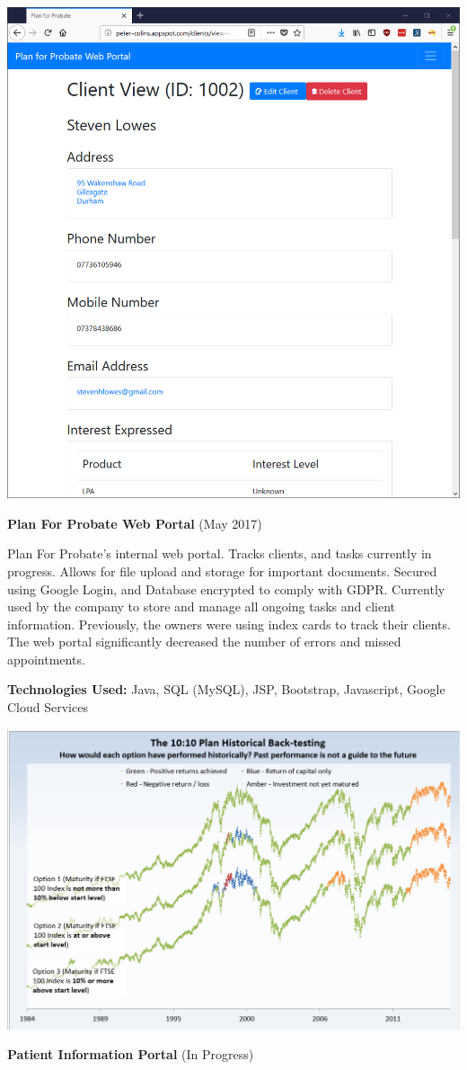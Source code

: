 \documentclass[hidelinks, 12pt, a4paper]{article}
\begin{document}
	\hspace{0.02\textwidth}
	\begin{minipage}{0.40\textwidth}		
		\begin{center}
			\includegraphics[width=0.9\linewidth]{planforprobate.png}
		\end{center}
		\vspace{-12pt}
		\textbf{Plan For Probate Web Portal} (May 2017)
		
		Plan For Probate's internal web portal. Tracks clients, and tasks currently in progress. Allows for file upload and storage for important documents. Secured using Google Login, and Database encrypted to comply with GDPR. Currently used by the company to store and manage all ongoing tasks and client information. Previously, the owners were using index cards to track their clients. The web portal significantly decreased the number of errors and missed appointments.
		
		\textbf{Technologies Used:} Java, SQL (MySQL), JSP, Bootstrap, Javascript, Google Cloud Services
		
		\begin{center}
			\includegraphics[width=0.9\linewidth]{backtest.png}
		\end{center}
		\vspace{-12pt}
		\textbf{Patient Information Portal} (In Progress)
		

\end{minipage}
\end{document}
